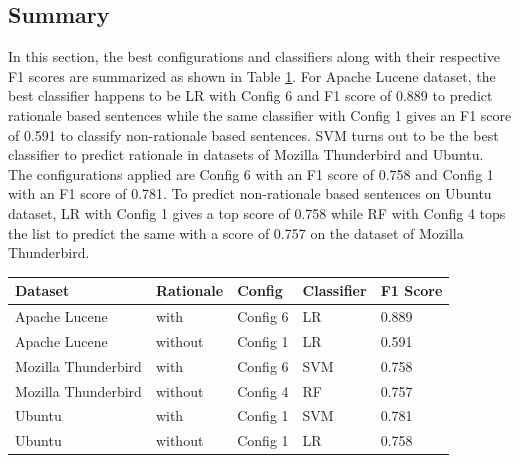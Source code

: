 \documentclass[a4paper,12pt,twoside]{report}
\begin{document}
\subsection{Summary}
In this section, the best configurations and classifiers along with their respective F1 scores are summarized as shown in Table \ref{tab:summaryBC}. For Apache Lucene dataset, the best classifier happens to be LR with Config 6 and F1 score of 0.889 to predict rationale based sentences while the same classifier with Config 1 gives an F1 score of 0.591 to classify non-rationale based sentences. SVM turns out to be the best classifier to predict rationale in datasets of Mozilla Thunderbird and Ubuntu. The configurations applied are Config 6 with an F1 score of 0.758 and Config 1 with an F1 score of 0.781. To predict non-rationale based sentences on Ubuntu dataset, LR with Config 1 gives a top score of 0.758 while RF with Config 4 tops the list to predict the same with a score of 0.757 on the dataset of Mozilla Thunderbird. 
\begin{table} %
    \centering
    \begin{adjustbox}{max width=\columnwidth}
    \def\arraystretch{1} %
    \begin{tabular}{p{4cm} p{2cm} p{2cm} p{2cm} p{2cm}}
        \toprule
        \textbf{Dataset} & \textbf{Rationale} & \textbf{Config} & \textbf{Classifier} & \textbf{F1 Score}\\
        \midrule
			Apache Lucene & with & Config 6 & LR & 0.889 \\
			Apache Lucene & without & Config 1 & LR & 0.591 \\
		\midrule
			Mozilla Thunderbird & with & Config 6 & SVM & 0.758 \\ 
			Mozilla Thunderbird & without & Config 4 & RF & 0.757 \\ 
		\midrule
			Ubuntu & with & Config 1 & SVM & 0.781 \\
			Ubuntu & without & Config 1 & LR & 0.758 \\
        \midrule
    \end{tabular}
    \end{adjustbox}
    \label{tab:summaryBC}
\end{table}
\end{document}
